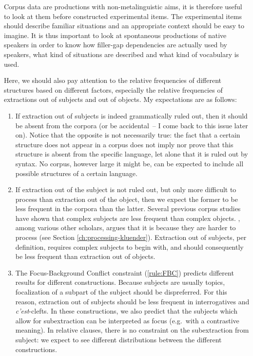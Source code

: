 Corpus data are productions with non-metalinguistic aims, it is therefore useful to look at them before constructed experimental items. The experimental items should describe familiar situations and an appropriate context should be easy to imagine. It is thus important to look at spontaneous productions of native speakers in order to know how filler-gap dependencies are actually used by speakers, what kind of situations are described and what kind of vocabulary is used. 

Here, we should also pay attention to the relative frequencies of different structures based on different factors, especially the relative frequencies of extractions out of subjects and out of objects. My expectations are as follows: 

\begin{enumerate}
    \item If extraction out of subjects is indeed grammatically ruled out, then it should be absent from the corpora (or be accidental~-- I come back to this issue later on). Notice that the opposite is not necessarily true: the fact that a certain structure does not appear in a corpus does not imply nor prove that this structure is absent from the specific language, let alone that it is ruled out by syntax. No corpus, however large it might be, can be expected to include all possible structures of a certain language. 
    \item If extraction out of the subject is not ruled out, but only more difficult to process than extraction out of the object, then we expect the former to be less frequent in the corpora than the latter. Several previous corpus studies have shown that complex subjects are less frequent than complex objects. \citet{Kluender.2004}, among various other scholars, argues that it is because they are harder to process (see Section \ref{ch:processing-kluender}). Extraction out of subjects, per definition, requires complex subjects to begin with, and should consequently be less frequent than extraction out of objects. 
    \item The Focus-Background Conflict constraint (\ref{rule:FBC}) predicts different results for different constructions. Because subjects are usually topics, focalization of a subpart of the subject should be dispreferred. For this reason, extraction out of subjects should be less frequent in interrogatives and \emph{c'est}-clefts. In these constructions, we also predict that the subjects which allow for subextraction can be interpreted as focus (e.g.\ with a contrastive meaning). In relative clauses, there is no constraint on the subextraction from subject: we expect to see different distributions between the different constructions.
\end{enumerate}

